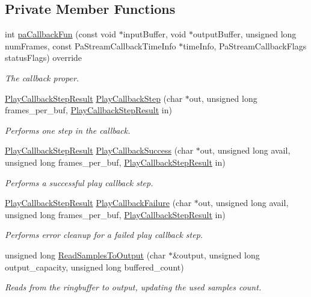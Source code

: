 \subsection*{Private Member Functions}
\begin{DoxyCompactItemize}
\item 
int \hyperlink{classAudioSink_ad3534ea4210aa83b42706c0361fd3e8d}{pa\+Callback\+Fun} (const void $\ast$input\+Buffer, void $\ast$output\+Buffer, unsigned long num\+Frames, const Pa\+Stream\+Callback\+Time\+Info $\ast$time\+Info, Pa\+Stream\+Callback\+Flags status\+Flags) override
\begin{DoxyCompactList}\small\item\em The callback proper. \end{DoxyCompactList}\item 
\hyperlink{classAudioSink_a73002cc57611ac384c4e9d419e706e50}{Play\+Callback\+Step\+Result} \hyperlink{classAudioSink_a450ad1c0c64ddcc9b9a40d325983cbd9}{Play\+Callback\+Step} (char $\ast$out, unsigned long frames\+\_\+per\+\_\+buf, \hyperlink{classAudioSink_a73002cc57611ac384c4e9d419e706e50}{Play\+Callback\+Step\+Result} in)
\begin{DoxyCompactList}\small\item\em Performs one step in the callback. \end{DoxyCompactList}\item 
\hyperlink{classAudioSink_a73002cc57611ac384c4e9d419e706e50}{Play\+Callback\+Step\+Result} \hyperlink{classAudioSink_a2194fd0629b52c550c9eb326f8ae10cc}{Play\+Callback\+Success} (char $\ast$out, unsigned long avail, unsigned long frames\+\_\+per\+\_\+buf, \hyperlink{classAudioSink_a73002cc57611ac384c4e9d419e706e50}{Play\+Callback\+Step\+Result} in)
\begin{DoxyCompactList}\small\item\em Performs a successful play callback step. \end{DoxyCompactList}\item 
\hyperlink{classAudioSink_a73002cc57611ac384c4e9d419e706e50}{Play\+Callback\+Step\+Result} \hyperlink{classAudioSink_a6e1b9254b242231ba8168e5e27d602ff}{Play\+Callback\+Failure} (char $\ast$out, unsigned long avail, unsigned long frames\+\_\+per\+\_\+buf, \hyperlink{classAudioSink_a73002cc57611ac384c4e9d419e706e50}{Play\+Callback\+Step\+Result} in)
\begin{DoxyCompactList}\small\item\em Performs error cleanup for a failed play callback step. \end{DoxyCompactList}\item 
unsigned long \hyperlink{classAudioSink_a00ed918435d6f65b9533869453d5ae56}{Read\+Samples\+To\+Output} (char $\ast$\&output, unsigned long output\+\_\+capacity, unsigned long buffered\+\_\+count)
\begin{DoxyCompactList}\small\item\em Reads from the ringbuffer to output, updating the used samples count. \end{DoxyCompactList}\end{DoxyCompactItemize}
